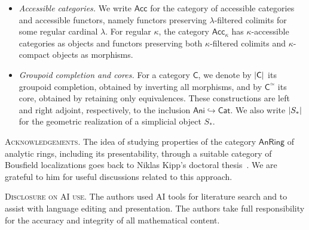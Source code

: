 \begin{itemize}[leftmargin=*, itemsep=0.5\baselineskip, topsep=0.5\baselineskip, parsep=0pt, before={}]
    \item \emph{Accessible categories.} We write $\mathsf{Acc}$ for the category of accessible categories and accessible functors, namely functors preserving $\lambda$-filtered colimits for some regular cardinal $\lambda$. For regular $\kappa$, the category $\mathsf{Acc}_\kappa$ has $\kappa$-accessible categories as objects and functors preserving both $\kappa$-filtered colimits and $\kappa$-compact objects as morphisms.

    \item \emph{Groupoid completion and cores.} For a category $\mathsf{C}$, we denote by $\mleft|\mathsf{C}\mright|$ its groupoid completion, obtained by inverting all morphisms, and by $\mathsf{C}^\simeq$ its core, obtained by retaining only equivalences. These constructions are left and right adjoint, respectively, to the inclusion $\mathsf{Ani}\hookrightarrow\mathsf{Cat}$. We also write $\mleft|S_\ast\mright|$ for the geometric realization of a simplicial object $S_\ast$.
\end{itemize}

\vspace{0.5em}

\textsc{Acknowledgements.} The idea of studying properties of the category $\mathsf{AnRing}$ of analytic rings, including its presentability, through a suitable category of Bousfield localizations goes back to Niklas Kipp's doctoral thesis~\cite{Kipp}. We are grateful to him for useful discussions related to this approach.

\vspace{0.5em}

\textsc{Disclosure on AI use.} The authors used AI tools for literature search and to assist with language editing and presentation. The authors take full responsibility for the accuracy and integrity of all mathematical content.